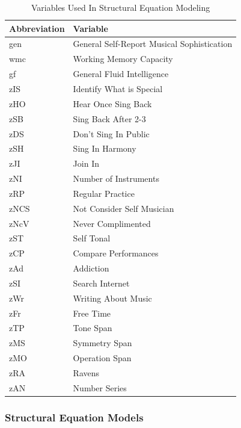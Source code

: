 \documentclass[12pt,]{book}
\begin{document}
\begin{table}[t]

\caption{\label{tab:exp2variables}Variables Used In Structural Equation Modeling}
\centering
\begin{tabular}{ll}
\toprule
Abbreviation & Variable\\
\midrule
gen & General Self-Report Musical Sophistication\\
wmc & Working Memory Capacity\\
gf & General Fluid Intelligence\\
zIS & Identify What is Special\\
zHO & Hear Once Sing Back\\
\addlinespace
zSB & Sing Back After 2-3\\
zDS & Don’t Sing In Public\\
zSH & Sing In Harmony\\
zJI & Join In\\
zNI & Number of Instruments\\
\addlinespace
zRP & Regular Practice\\
zNCS & Not Consider Self Musician\\
zNcV & Never Complimented\\
zST & Self Tonal\\
zCP & Compare Performances\\
\addlinespace
zAd & Addiction\\
zSI & Search Internet\\
zWr & Writing About Music\\
zFr & Free Time\\
zTP & Tone Span\\
\addlinespace
zMS & Symmetry Span\\
zMO & Operation Span\\
zRA & Ravens\\
zAN & Number Series\\
\bottomrule
\end{tabular}
\end{table}

\hypertarget{structural-equation-models}{%
\subsubsection{Structural Equation Models}\label{structural-equation-models}}
\end{document}
